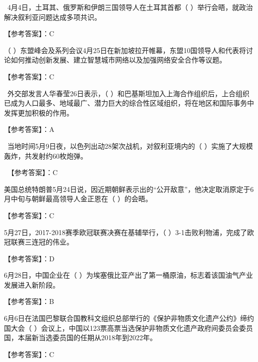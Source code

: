 \question ~4月4日，土耳其、俄罗斯和伊朗三国领导人在土耳其首都（
）举行会晤，就政治解决叙利亚问题达成多项共识。
\par{}
\begin{solution}【参考答案】：C
\end{solution}
\question （
）东盟峰会及系列会议4月25日在新加坡拉开帷幕，东盟10国领导人和代表将讨论如何推动创新发展、建立智慧城市网络以及加强网络安全合作等议题。
\par{}
\begin{solution}【参考答案】：C
\end{solution}
\question ~外交部发言人华春莹26日表示，（
）和巴基斯坦加入上海合作组织后，上合组织已成为人口最多、地域最广、潜力巨大的综合性区域组织，将在地区和国际事务中发挥更加积极的作用。
\par{}
\begin{solution}【参考答案】：A
\end{solution}
\question ~当地时间5月9日夜，以色列出动28架次战机，对叙利亚境内的（
）实施了大规模轰炸，共发射约60枚炮弹。
\par{}
\begin{solution}~【参考答案】：C~~
\end{solution}
\question 美国总统特朗普5月24日说，因近期朝鲜表示出的``公开敌意''，他决定取消原定于6月中旬与朝鲜最高领导人金正恩在（
）的会晤。
\par{}
\begin{solution}【参考答案】：C
\end{solution}
\question 5月27日，2017-2018赛季欧冠联赛决赛在基辅举行，（
）3-1击败利物浦，完成了欧冠联赛三连冠的伟业。
\par{}
\begin{solution}【参考答案】：D~~
\end{solution}
\question 6月28日，中国企业在（
）为埃塞俄比亚产出了第一桶原油，标志着该国油气产业发展进入新阶段。
\par{}
\begin{solution}【参考答案】：B~
\end{solution}
\question 6月6日在法国巴黎联合国教科文组织总部举行的《保护非物质文化遗产公约》缔约国大会（
）会议上，中国以123票高票当选保护非物质文化遗产政府间委员会委员国，本届新当选委员国的任期从2018年到2022年。
\par{}
\begin{solution}【参考答案】：C~ ~
\end{solution}
